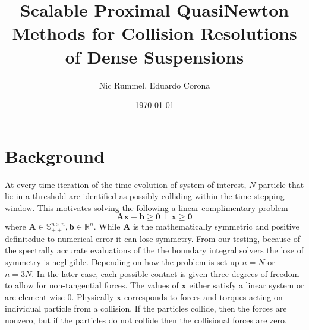 \documentclass{article}
\newcommand{\x}{\mathbf{x}}
\renewcommand{\b}{\mathbf{b}}
\newcommand{\A}{\mathbf{A}}
\begin{document}
\title{Scalable Proximal QuasiNewton Methods for Collision Resolutions of Dense Suspensions}
\author{{Nic Rummel}, {Eduardo Corona}}
\date{\today}
\maketitle


\section{Background}
At every time iteration of the time evolution of system of interest, $N$ particle that lie in a threshold are identified as possibly colliding within the time stepping window. This motivates solving the following a linear complimentary problem
\[\A\x -\b \geq \mathbf{0} \perp \x \geq \mathbf{0}\]
where $\A \in \mathbb{S}_{++}^{n \times n}, \b \in \mathbb{R}^n$. While $\A$ is the mathematically symmetric and positive definitedue to numerical error it can lose symmetry. From our testing, because of the spectrally accurate evaluations of the the boundary integral solvers the lose of symmetry is negligible. Depending on how the problem is set up $n=N$ or $n=3N$. In the later case, each possible contact is given three degrees of freedom to allow for non-tangential forces. The values of $\x$ either satisfy a linear system or are element-wise 0. Physically $\x$ corresponds to forces and torques acting on individual particle from a collision. If the particles collide, then the forces are nonzero, but if the particles do not collide then the collisional forces are zero.

\end{document}
